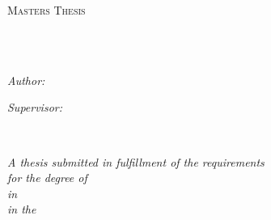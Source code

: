 \documentclass[
10pt, %
oneside, %
english, %
singlespacing, %
headsepline, %
]{style} %
\author{Andre M M \textsc{Faria}} %
\begin{document}
\frontmatter %

\pagestyle{plain} %


\begin{titlepage}
	\begin{center}

		\vspace*{.06\textheight}
		{\scshape\LARGE \univname\par}\vspace{1.5cm} %
		\textsc{\Large Masters Thesis}\\[0.5cm] %

		\HRule \\[0.4cm] %
		{\huge \bfseries \ttitle\par}\vspace{0.4cm} %
		\HRule \\[1.5cm] %

		\begin{minipage}[t]{0.4\textwidth}
			\begin{flushleft} \large
				\emph{Author:}\\
				\href{https://www.linkedin.com/in/andremmfaria/}{\authorname} %
			\end{flushleft}
		\end{minipage}
		\begin{minipage}[t]{0.4\textwidth}
			\begin{flushright} \large
				\emph{Supervisor:} \\
				\href{https://www.tudublin.ie/explore/faculties-and-schools/computing-digital-data/informatics-and-cybersecurity/people/academic-staff/robertsmith.php}{\supname} %
			\end{flushright}
		\end{minipage}\\[2cm]

		\vfill

		\large \textit{A thesis submitted in fulfillment of the requirements\\ for the degree of \degreename\\ in \subjectname}\\[0.4cm] %
		\textit{in the}\\[0.4cm]
		\deptname\\[2cm] %


\end{center}
\end{titlepage}
\end{document}
